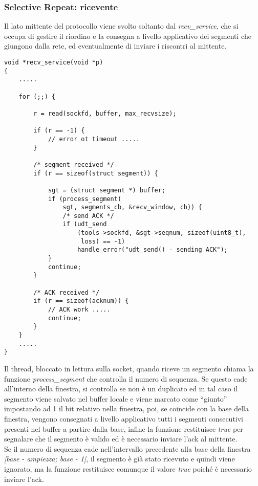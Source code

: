 \subsubsection{Selective Repeat: ricevente}
Il lato mittente del protocollo viene svolto soltanto dal 
\emph{recv\_service}, che si occupa di gestire il riordino
e la consegna a livello applicativo dei segmenti che giungono 
dalla rete, ed eventualmente di inviare i riscontri al mittente.
\begin{lstlisting}[title=transport.c]
void *recv_service(void *p)
{
    .....

    for (;;) {

        r = read(sockfd, buffer, max_recvsize);

        if (r == -1) {
            // error ot timeout .....     
        }

        /* segment received */
        if (r == sizeof(struct segment)) {

            sgt = (struct segment *) buffer;
            if (process_segment(
                sgt, segments_cb, &recv_window, cb)) {
                /* send ACK */
                if (udt_send
                    (tools->sockfd, &sgt->seqnum, sizeof(uint8_t),
                     loss) == -1)
                    handle_error("udt_send() - sending ACK");
            }
            continue;
        }

        /* ACK received */
        if (r == sizeof(acknum)) {
            // ACK work .....
            continue;
        }
    }
    .....
}
\end{lstlisting}
Il thread, bloccato in lettura sulla socket, quando riceve un segmento
chiama la funzione \emph{process\_segment} che controlla il numero di 
sequenza. Se questo cade all'interno della finestra, si controlla se non
è un duplicato ed in tal caso il segmento viene salvato nel buffer locale
e viene marcato come ``giunto'' impostando ad 1 il bit relativo nella finestra,
poi, se coincide con la base della finestra, vengono consegnati a livello 
applicativo tutti i segmenti
consecutivi presenti nel buffer a partire dalla base, infine la funzione
restituisce \emph{true} per segnalare che il segmento è valido ed 
è necessario inviare l'ack al mittente.\\
Se il numero di sequenza cade nell'intervallo precedente alla base della
finestra \emph{[base - ampiezza; base - 1]},
il segmento è già stato ricevuto e quindi 
viene ignorato, ma la funzione restituisce comunque il valore \emph{true}
poiché è necessario inviare l'ack.\\
